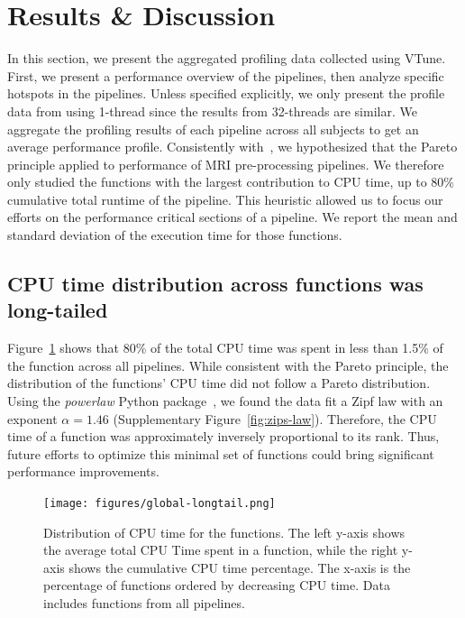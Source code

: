 \documentclass[conference]{IEEEtran}
\begin{document}
\section{Results \& Discussion}
In this section, we present the aggregated profiling data collected using VTune. First, we present a performance overview of the pipelines, then analyze specific hotspots in the pipelines. Unless specified explicitly, we only present the profile data from using 1-thread since the results from 32-threads are similar. 
We aggregate the profiling results of each pipeline across all subjects to get an average performance profile. Consistently with~\cite{Kukunas2015-jd}, we hypothesized that the Pareto principle applied to performance of MRI pre-processing pipelines. We therefore only studied the functions with the largest contribution to CPU time, up to 80\% cumulative total runtime of the pipeline. This heuristic allowed us to focus our efforts on the performance critical sections of a pipeline. We report the mean and standard deviation of the execution time for those functions. 
			
\subsection{CPU time distribution across functions was long-tailed}
Figure~\ref{fig:long-tail-distribution} shows that 80\% of the total CPU time was spent in less than 1.5\% of the function across all pipelines. While consistent with the Pareto principle, the distribution of the functions' CPU time did not follow a Pareto distribution. Using the \textit{powerlaw} Python package~\cite{Alstott2014-gr}, we found the data fit a Zipf law with an exponent $\alpha=1.46$ (Supplementary Figure~\ref{fig:zips-law}). Therefore, the CPU time of a function was approximately inversely proportional to its rank. Thus, future efforts to optimize this minimal set of functions could bring significant performance improvements. 

\begin{figure}[ht]
	\centering
	\texttt{[image: figures/global-longtail.png]}
	\caption{Distribution of CPU time for the functions. The left y-axis shows the average total CPU Time spent in a function, while the right y-axis shows the cumulative CPU time percentage. The x-axis is the percentage of functions ordered by decreasing CPU time. Data includes functions from all pipelines.}
	\label{fig:long-tail-distribution}
\end{figure}
\end{document}
